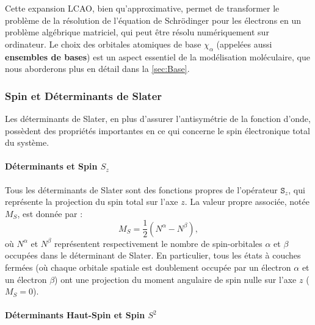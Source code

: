 \documentclass[12pt,a4paper]{article} %
\numberwithin{equation}{section} %
\numberwithin{figure}{section} %
\numberwithin{table}{section} %
\begin{document}
Cette expansion LCAO, bien qu'approximative, permet de transformer le problème de la résolution de l'équation de Schrödinger pour les électrons en un problème algébrique matriciel, qui peut être résolu numériquement sur ordinateur. Le choix des orbitales atomiques de base $\chi_\alpha$ (appelées aussi \textbf{ensembles de bases}) est un aspect essentiel de la modélisation moléculaire, que nous aborderons plus en détail dans la \autoref{sec:Base}.


\subsubsection{Spin et Déterminants de Slater}

Les déterminants de Slater, en plus d'assurer l'antisymétrie de la fonction d'onde, possèdent des propriétés importantes en ce qui concerne le spin électronique total du système.

\paragraph{Déterminants et Spin $S_z$}

Tous les déterminants de Slater sont des fonctions propres de l'opérateur $ \mathtt{S}_z$, qui représente la projection du spin total sur l'axe $z$.  La valeur propre associée, notée $M_S$, est donnée par :
\begin{equation}
    M_S = \frac12 (N^\alpha - N^\beta),
\end{equation}
où $N^\alpha$ et $N^\beta$ représentent respectivement le nombre de spin-orbitales $\alpha$ et $\beta$ occupées dans le déterminant de Slater. En particulier, tous les états à couches fermées (où chaque orbitale spatiale est doublement occupée par un électron $\alpha$ et un électron $\beta$) ont une projection du moment angulaire de spin nulle sur l'axe $z$ ($M_S = 0$).

\paragraph{Déterminants Haut-Spin et Spin $S^2$}
\end{document}

